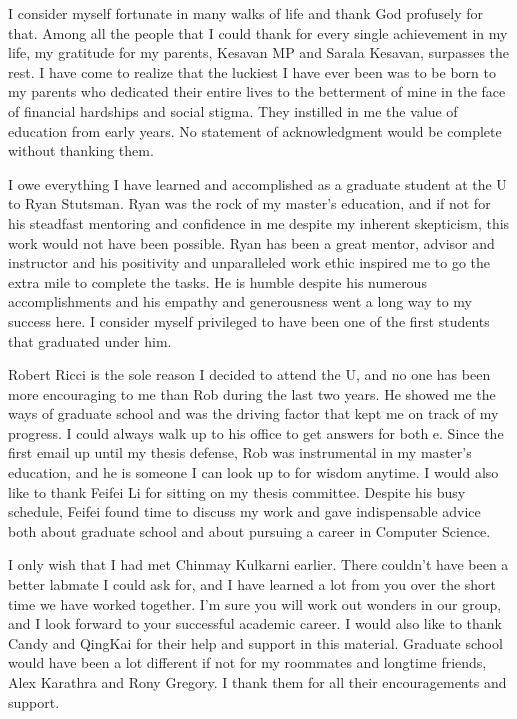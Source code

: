 I consider myself fortunate in many walks of life and thank God profusely for that. Among all the people that I could thank for every single achievement in my life, my gratitude for my parents, Kesavan MP 
and Sarala Kesavan, surpasses the rest. I have come to realize that the luckiest I have ever been was to be born to my parents who dedicated their entire lives to the betterment of mine in the face of financial hardships and social stigma. They instilled in me the value of education from early years. No statement of acknowledgment would be complete without thanking them.

I owe everything I have learned and accomplished as a graduate student at the U to Ryan Stutsman. Ryan was the rock of my master's education, and if not for his steadfast mentoring and confidence in me despite my inherent skepticism, this work would not have been possible. Ryan has been a great mentor, advisor and instructor and his positivity and unparalleled work ethic inspired me to go the extra mile to complete the tasks. He is humble despite his numerous accomplishments and his empathy and generousness went a long way to my success here. I consider myself privileged to have been one of the first students that graduated under him.

Robert Ricci is the sole reason I decided to attend the U, and no one has been more encouraging to me than Rob during the last two years. He showed me the ways of graduate school and
was the driving factor that kept me on track of my progress. I could always walk up to his office to get answers for both e. Since the first email up until my thesis defense, Rob was instrumental in my master's education, and he is someone I can look up to for wisdom anytime. I would also like to thank Feifei Li for sitting on my thesis committee. Despite his busy schedule, Feifei found time to discuss my work and gave indispensable advice both about graduate school and about pursuing a career in Computer Science.

I only wish that I had met Chinmay Kulkarni earlier. There couldn't have been a better labmate I could ask for, and  I have learned a lot from you over the short time we have worked together. I'm sure you will work out wonders in our group, and I look forward to your successful academic career. I would also like to thank Candy and QingKai for their help and support in this material. Graduate school would have been a lot different if not for my roommates and longtime friends, Alex Karathra and Rony Gregory. I thank them for all their encouragements and support.

